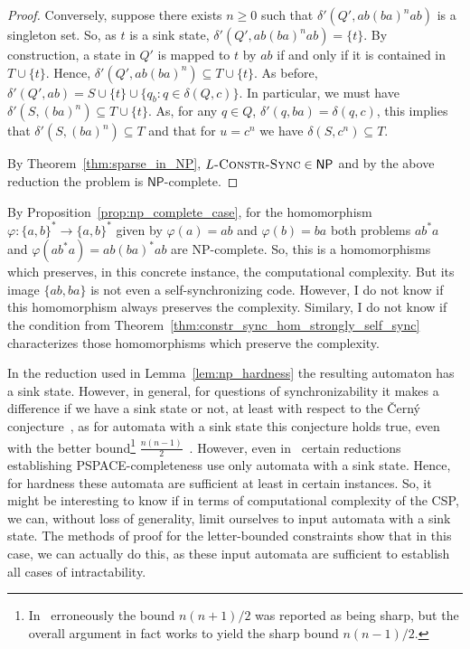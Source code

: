\documentclass[runningheads,envcountsame]{llncs}
\theoremstyle{plain}
\theoremstyle{definition}
\newcommand{\NP}{\textsf{NP}}
\newcommand{\PSPACE}{\textsf{PSPACE}}
\begin{document}
\begin{proof}
 
 Conversely, suppose there exists $n \ge 0$
 such that $\delta'(Q', ab(ba)^nab)$
 is a singleton set. So, as $t$ is a sink state,
 $\delta'(Q', ab(ba)^nab) = \{ t \}$.
 By construction, a state in $Q'$ is mapped to $t$
 by $ab$
 if and only if it is contained in $T \cup \{t\}$.
 Hence, $\delta'(Q', ab(ba)^n) \subseteq T \cup \{t\}$.
 As before, $\delta'(Q', ab) = S \cup \{t\} \cup \{ q_b : q \in \delta(Q, c) \}$.
 In particular, we must have $\delta'(S, (ba)^n) \subseteq T \cup \{t\}$.
 As, for any $q \in Q$, $\delta'(q, ba) = \delta(q, c)$,
 this implies that $\delta'(S, (ba)^n) \subseteq T$
 and that for $u = c^n$ we have $\delta(S, c^n) \subseteq T$.
 
 
 By Theorem~\ref{thm:sparse_in_NP}, $L\textsc{-Constr-Sync}\in \NP$
 and by the above reduction the problem is $\NP$-complete.
 \end{proof}

 By Proposition~\ref{prop:np_complete_case},
 for the homomorphism $\varphi : \{a,b\}^* \to \{a,b\}^*$
 given by $\varphi(a) = ab$ and $\varphi(b) = ba$
 both problems $ab^*a$ and $\varphi(ab^*a) = ab(ba)^*ab$
 are \NP-complete. So, this is a homomorphisms
 which preserves, in this concrete instance, the computational complexity.
 But its image $\{ab,ba\}$ is not even a self-synchronizing code.
 However, I do not know if this homomorphism always preserves the complexity.
 Similary, I do not know
 if the condition from Theorem~\ref{thm:constr_sync_hom_strongly_self_sync}
 characterizes those homomorphisms which preserve the complexity.



 In the reduction used in Lemma~\ref{lem:np_hardness}
 the resulting automaton has a sink state. However, in general, for questions
 of synchronizability it makes a difference if we have a sink state
 or not, at least with respect to the \v{C}ern\'y conjecture~\cite{Cer64},
 as for automata with a sink state this conjecture holds true,
 even with the better bound\footnote{In~\cite{DBLP:journals/tcs/Rystsov97}
 erroneously the bound $n(n+1)/2$ was reported as being sharp, but the overall argument
 in fact works to yield the sharp bound $n(n-1)/2$.}
 $\frac{n(n-1)}{2}$~\cite{DBLP:journals/tcs/Rystsov97,DBLP:journals/tcs/Volkov09}. However,
 even in~\cite{DBLP:conf/mfcs/FernauGHHVW19}
 certain reductions establishing \PSPACE-completeness
 use only automata with a sink state. Hence, for hardness
 these automata are sufficient at least in certain instances.
 So, it might be interesting to know
 if in terms of computational complexity of the CSP,
 we can, without loss of generality, limit ourselves to input automata
 with a sink state. The methods of proof for the letter-bounded constraints
 show that in this case, we can actually do this, as these input automata
 are sufficient to establish all cases of intractability.
 
\end{document}
